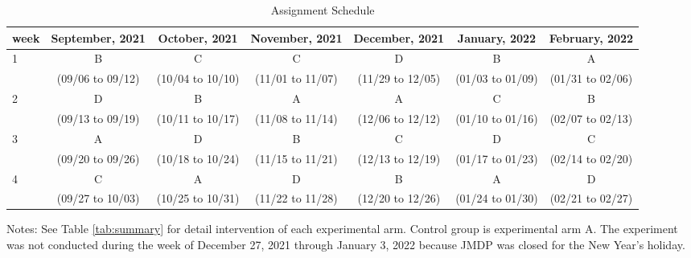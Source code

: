 \documentclass[12pt, a4paper]{article}
\begin{document}
\begin{table}[H]

\caption{\label{tab:assignment}Assignment Schedule}
\centering
\fontsize{9}{11}\selectfont
\begin{threeparttable}
\begin{tabular}[t]{lcccccc}
\toprule
week & September, 2021 & October, 2021 & November, 2021 & December, 2021 & January, 2022 & February, 2022\\
\midrule
1 & B & C & C & D & B & A\\
 & (09/06 to 09/12) & (10/04 to 10/10) & (11/01 to 11/07) & (11/29 to 12/05) & (01/03 to 01/09) & (01/31 to 02/06)\\
2 & D & B & A & A & C & B\\
 & (09/13 to 09/19) & (10/11 to 10/17) & (11/08 to 11/14) & (12/06 to 12/12) & (01/10 to 01/16) & (02/07 to 02/13)\\
3 & A & D & B & C & D & C\\
 & (09/20 to 09/26) & (10/18 to 10/24) & (11/15 to 11/21) & (12/13 to 12/19) & (01/17 to 01/23) & (02/14 to 02/20)\\
4 & C & A & D & B & A & D\\
 & (09/27 to 10/03) & (10/25 to 10/31) & (11/22 to 11/28) & (12/20 to 12/26) & (01/24 to 01/30) & (02/21 to 02/27)\\
\bottomrule
\end{tabular}
\begin{tablenotes}
\item Notes: See Table \ref{tab:summary} for detail intervention of each experimental arm. Control group is experimental arm A. The experiment was not conducted during the week of December 27, 2021 through January 3, 2022 because JMDP was closed for the New Year's holiday.
\end{tablenotes}
\end{threeparttable}
\end{table}
\end{document}
